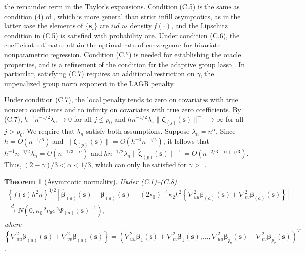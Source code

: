 \documentclass[authoryear,review, 12pt]{elsarticle}
\newtheorem{thm}{Theorem}
\begin{document}
the remainder term in the Taylor's expansions. Condition (C.5) is
the same as condition (4) of \citet{Sun-Yan-Zhang-Lu-2014}, which
is more general than strict infill asymptotics, as in the latter case
the elements of $\{\bm{s}_{i}\}$ are $iid$ as density $f(\cdot)$,
and the Lipschitz condition in (C.5) is satisfied with probability
one. Under condition (C.6), the coefficient estimates attain the optimal
rate of convergence for bivariate nonparametric regression. Condition
(C.7) is needed for establishing the oracle properties, and is a refinement
of the condition for the adaptive group lasso \citep{Wang-Leng-2008}.
In particular, satisfying (C.7) requires an additional restriction
on $\gamma$, the unpenalized group norm exponent in the LAGR penalty.

Under condition (C.7), the local penalty tends to zero on covariates
with true nonzero coefficients and to infinity on covariates with
true zero coefficients. By (C.7), $h^{-1}n^{-1/2}\lambda_{n}\to0$
for all $j\le p_{0}$ and $hn^{-1/2}\lambda_{n}\|\bm{\zeta}_{(j)}(\bm{s})\|^{-\gamma}\to\infty$
for all $j>p_{0}$. We require that $\lambda_{n}$ satisfy both assumptions.
Suppose $\lambda_{n}=n^{\alpha}$. Since $h=O\left(n^{-1/6}\right)$
and $\|\tilde{\bm{\zeta}}_{(p)}(\bm{s})\|=O\left(h^{-1}n^{-1/2}\right)$,
it follows that $h^{-1}n^{-1/2}\lambda_{n}=O\left(n^{-1/3+\alpha}\right)$
and $hn^{-1/2}\lambda_{n}\|\tilde{\bm{\zeta}}_{(p)}(\bm{s})\|^{-\gamma}=O\left(n^{-2/3+\alpha+\gamma/3}\right)$.
Thus, $\left(2-\gamma\right)/3<\alpha<1/3$, which can only be satisfied
for $\gamma>1$.
\begin{thm}[Asymptotic normality]
\label{theorem:normality}  Under (C.1)--(C.8),
\begin{gather*}
\left\{ f(\bm{s})h^{2}n\right\} ^{1/2}\left[\hat{\bm{\beta}}_{(a)}(\bm{s})-\bm{\beta}_{(a)}(\bm{s})-(2\kappa_{0})^{-1}\kappa_{2}h^{2}\left\{ \nabla_{uu}^{2}\bm{\beta}_{(a)}(\bm{s})+\nabla_{vv}^{2}\bm{\beta}_{(a)}(\bm{s})\right\} \right]\\
\xrightarrow{d}N\left(0,\kappa_{0}^{-2}\nu_{0}\sigma^{2}\Psi_{(a)}(\bm{s})^{-1}\right),
\end{gather*}
where $\left\{ \nabla_{uu}^{2}\bm{\beta}_{(a)}(\bm{s})+\nabla_{vv}^{2}\bm{\beta}_{(a)}(\bm{s})\right\} =\left(\nabla_{uu}^{2}\bm{\beta}_{1}(\bm{s})+\nabla_{vv}^{2}\bm{\beta}_{1}(\bm{s}),\dots,\nabla_{uu}^{2}\bm{\beta}_{p_{o}}(\bm{s})+\nabla_{vv}^{2}\bm{\beta}_{p_{o}}(\bm{s})\right)^{T}$.
\end{thm}
\end{document}
